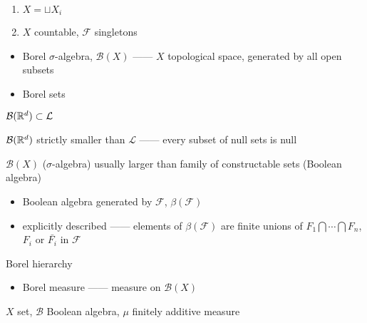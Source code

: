 \begin{example}\,
    \begin{enumerate}
        \item $X = \sqcup X_i$
        \item $X$ countable, $\mathcal{F}$ singletons
    \end{enumerate}
\end{example}

\begin{itemize}
    \item Borel $\sigma$-algebra, $\mathcal{B}(X)$ ------ $X$ topological space, generated by all open subsets
    \item Borel sets
\end{itemize}

\begin{fact}
    $\mathcal{B}(\mathbb{R}^d) \subset \mathcal{L}$
\end{fact}

\begin{fact}
    $\mathcal{B}(\mathbb{R}^d)$ strictly smaller than $\mathcal{L}$ ------ every subset of null sets is null
\end{fact}

\begin{fact}
    $\mathcal{B}(X)$ ($\sigma$-algebra) usually larger than family of constructable sets (Boolean algebra)
\end{fact}

\begin{itemize}
    \item Boolean algebra generated by $\mathcal{F}$, $\beta(\mathcal{F})$
    \item explicitly described ------ elements of $\beta(\mathcal{F})$ are finite unions of $F_1 \bigcap \cdots \bigcap F_n$, $F_i$ or $\bar{F_i}$ in $\mathcal{F}$
\end{itemize}

\begin{myth}
    Borel hierarchy
\end{myth}

\begin{itemize}
    \item Borel measure ------ measure on $\mathcal{B}(X)$
\end{itemize}

\begin{setting}\label{set-sec4}
    $X$ set, $\mathcal{B}$ Boolean algebra, $\mu$ finitely additive measure
\end{setting}

